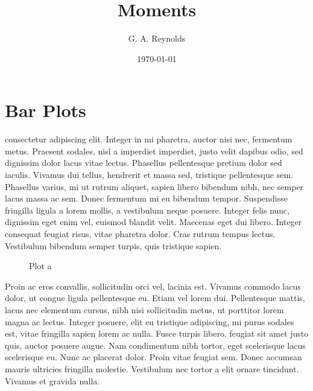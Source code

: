 \documentclass{tufte-handout}
\title{Moments}
\author{G. A. Reynolds}
\date{\today}
\begin{document}
\maketitle
\nocite{*}

\tableofcontents

\section{Bar Plots}







 consectetur adipiscing elit. Integer in mi pharetra, auctor nisi nec, fermentum metus. Praesent sodales, nisl a imperdiet imperdiet, justo velit dapibus odio, sed dignissim dolor lacus vitae lectus. Phasellus pellentesque pretium dolor sed iaculis. Vivamus dui tellus, hendrerit et massa sed, tristique pellentesque sem. Phasellus varius, mi ut rutrum aliquet, sapien libero bibendum nibh, nec semper lacus massa ac sem. Donec fermentum mi eu bibendum tempor. Suspendisse fringilla ligula a lorem mollis, a vestibulum neque posuere. Integer felis nunc, dignissim eget enim vel, euismod blandit velit. Maecenas eget dui libero. Integer consequat feugiat risus, vitae pharetra dolor. Cras rutrum tempus lectus. Vestibulum bibendum semper turpis, quis tristique sapien.


\begin{figure}[h!]
\caption{Plot a}
\end{figure}

Proin ac eros convallis, sollicitudin orci vel, lacinia est. Vivamus commodo lacus dolor, ut congue ligula pellentesque eu. Etiam vel lorem dui. Pellentesque mattis, lacus nec elementum cursus, nibh nisi sollicitudin metus, ut porttitor lorem magna ac lectus. Integer posuere, elit eu tristique adipiscing, mi purus sodales est, vitae fringilla sapien lorem ac nulla. Fusce turpis libero, feugiat sit amet justo quis, auctor posuere augue. Nam condimentum nibh tortor, eget scelerisque lacus scelerisque eu. Nunc ac placerat dolor. Proin vitae feugiat sem. Donec accumsan mauris ultricies fringilla molestie. Vestibulum nec tortor a elit ornare tincidunt. Vivamus et gravida nulla.
\end{document}
